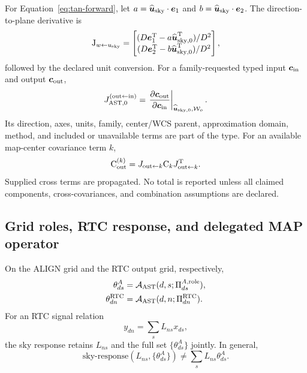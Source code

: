 For Equation~\ref{eq:tan-forward}, let
$a=\widehat{\boldsymbol u}_{\rm sky}\cdot\boldsymbol e_1$ and
$b=\widehat{\boldsymbol u}_{\rm sky}\cdot\boldsymbol e_2$.  The
direction-to-plane derivative is
\begin{equation}
 \mathsf J_{w\leftarrow u_{\rm sky}}=
 \begin{bmatrix}
 (D\boldsymbol e_1^\mathsf T-a\widehat{\boldsymbol u}_{\rm sky,0}^\mathsf T)/D^2\\
 (D\boldsymbol e_2^\mathsf T-b\widehat{\boldsymbol u}_{\rm sky,0}^\mathsf T)/D^2
 \end{bmatrix},
 \label{eq:projection-jacobian}
\end{equation}
followed by the declared unit conversion.  For a family-requested typed input
$\boldsymbol c_{\rm in}$ and output $\boldsymbol c_{\rm out}$,
\begin{equation}
 J_{\rm AST,0}^{({\rm out}\leftarrow{\rm in})}
 =\left.\frac{\partial\boldsymbol c_{\rm out}}
                {\partial\boldsymbol c_{\rm in}}\right|_{\widehat{\boldsymbol u}_{\rm sky,0},
                \mathcal W_o}.
 \label{eq:map-center-jacobian}
\end{equation}
Its direction, axes, units, family, center/WCS parent, approximation domain,
method, and included or unavailable terms are part of the type.  For an available
map-center covariance term $k$,
\begin{equation}
 \mathsf C_{\rm out}^{(k)}=
 J_{{\rm out}\leftarrow k}\mathsf C_k
 J_{{\rm out}\leftarrow k}^{\mathsf T}.
 \label{eq:center-covariance}
\end{equation}
Supplied cross terms are propagated.  No total is reported unless all claimed
components, cross-covariances, and combination assumptions are declared.

\subsection{Grid roles, RTC response, and delegated MAP operator}

On the ALIGN grid and the RTC output grid, respectively,
\begin{align}
 \theta^A_{ds}
   &=\mathcal A_{\rm AST}(d,s;\Pi^{A,{\rm role}}_{ds}),
   \label{eq:theta-align}\\
 \theta^{\rm RTC}_{dn}
   &=\mathcal A_{\rm AST}(d,n;\Pi^{\rm RTC}_{dn}).
   \label{eq:theta-rtc}
\end{align}
For an RTC signal relation
\begin{equation}
 y_{dn}=\sum_s L_{ns}x_{ds},
 \label{eq:rtc-signal}
\end{equation}
the sky response retains $L_{ns}$ and the full set
$\{\theta^A_{ds}\}$ jointly.  In general,
\begin{equation}
 \text{sky-response}(L_{ns},\{\theta^A_{ds}\})
 \neq \sum_s L_{ns}\theta^A_{ds}.
 \label{eq:not-angular-filter}
\end{equation}


